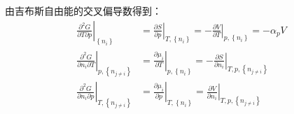 \documentclass[main.tex]{subfiles}
\begin{document}
由吉布斯自由能的交叉偏导数得到：
\begin{align}
    \left.\frac{\partial^2 G}{\partial T\partial p}\right|_{\left\{n_i\right\}}             & =\left.\frac{\partial S}{\partial p}\right|_{T,\left\{n_i\right\}}=-\left.\frac{\partial V}{\partial T}\right|_{p,\left\{n_i\right\}}=-\alpha_p V     \\
    \left.\frac{\partial ^2G}{\partial n_i\partial T}\right|_{p,\left\{n_{j\neq i}\right\}} & =\left.\frac{\partial \mu_i}{\partial T}\right|_{p,\left\{n_i\right\}}=-\left.\frac{\partial S}{\partial n_i}\right|_{T,p,\left\{n_{j\neq i}\right\}} \\
    \left.\frac{\partial ^2G}{\partial n_i\partial p}\right|_{T,\left\{n_{j\neq i}\right\}} & =\left.\frac{\partial \mu_i}{\partial p}\right|_{T,\left\{n_i\right\}}=\left.\frac{\partial V}{\partial n_i}\right|_{T,p,\left\{n_{j\neq i}\right\}}
\end{align}
\end{document}
